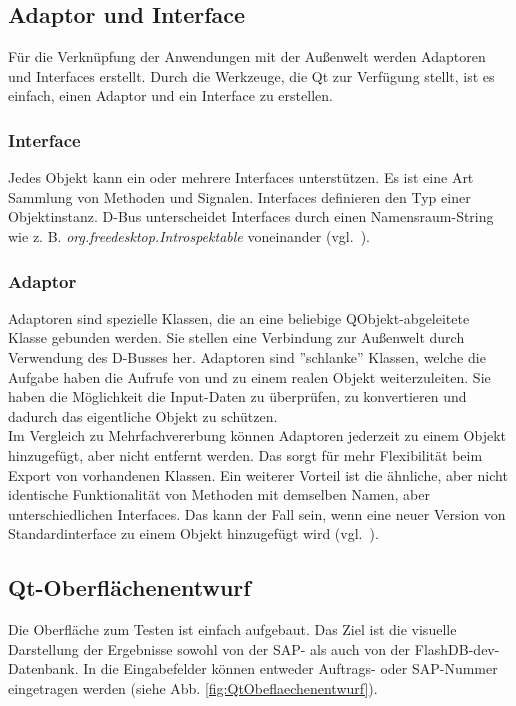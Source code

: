 \subsection{Adaptor und Interface} \label{AdaptorInterface}
Für die Verknüpfung der Anwendungen mit der Außenwelt werden Adaptoren und Interfaces erstellt. Durch die Werkzeuge, die Qt zur Verfügung stellt, ist es einfach, einen Adaptor und ein Interface zu erstellen. 
\subsubsection{Interface}
Jedes Objekt kann ein oder mehrere Interfaces unterstützen. Es ist eine Art Sammlung von Methoden und Signalen. Interfaces definieren den Typ einer Objektinstanz. D-Bus unterscheidet Interfaces durch einen Namensraum-String wie z. B. \textit{org.freedesktop.Introspektable} voneinander \mbox{(vgl. \cite[Web]{freedesktop2015})}.
\subsubsection{Adaptor}
Adaptoren sind spezielle Klassen, die an eine beliebige QObjekt-abgeleitete Klasse gebunden werden. Sie stellen eine Verbindung zur Außenwelt durch Verwendung des D-Busses her. Adaptoren sind ''schlanke'' Klassen, welche die Aufgabe haben die Aufrufe von und zu einem realen Objekt weiterzuleiten. Sie haben die Möglichkeit die Input-Daten zu überprüfen, zu konvertieren und dadurch das eigentliche Objekt zu schützen. \\
Im Vergleich zu Mehrfachvererbung können Adaptoren jederzeit zu einem Objekt hinzugefügt, aber nicht entfernt werden. Das sorgt für mehr Flexibilität beim Export von vorhandenen Klassen. Ein weiterer Vorteil ist die ähnliche, aber nicht identische Funktionalität von Methoden mit demselben Namen, aber unterschiedlichen Interfaces. Das kann der Fall sein, wenn eine neuer Version von Standardinterface zu einem Objekt hinzugefügt wird \mbox{(vgl. \cite[Web]{Qt2015a})}.
  
\subsection{Qt-Oberflächenentwurf}
Die Oberfläche zum Testen ist einfach aufgebaut. Das Ziel ist die visuelle Darstellung der Ergebnisse sowohl von der SAP- als auch von der FlashDB-dev-Datenbank. In die Eingabefelder können entweder Auftrags- oder SAP-Nummer eingetragen werden (siehe Abb. \ref{fig:QtObeflaechenentwurf}). 


